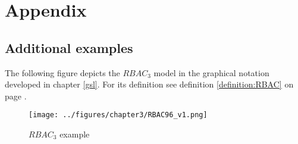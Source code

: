 \documentclass[twoside, openright, 12pt]{book}
\begin{document}
\cleardoublepage
{}
\renewcommand{\thesection}{\Alph{section}}
\chapter*{Appendix}
\label{appendix}
\section{Additional examples}
The following figure depicts the $RBAC_3$ model in the graphical notation developed in chapter \ref{gsl}.
For its definition see definition \ref{definition:RBAC} on page \pageref{definition:RBAC}.

\begin{figure}[htb]
	\centering
	\texttt{[image: ../figures/chapter3/RBAC96\_v1.png]}
	\caption{$RBAC_3$ example}
	\label{fig:RBAC96_example}
\end{figure}



\cleardoublepage
\DeclareRobustCommand{\citeext}[1]{\citeauthor{#1}~\cite{#1}}




\end{document}
